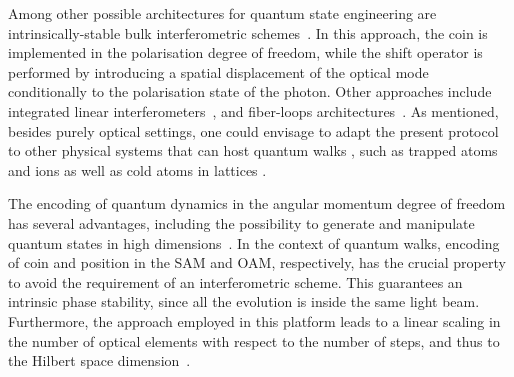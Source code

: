 Among other possible architectures for quantum state engineering are intrinsically-stable bulk interferometric schemes~\cite{broome2010discrete,kitagawa2012observation,vitelli2013joining}.
In this approach, the coin is implemented in the polarisation degree of freedom,
while the shift operator is performed by introducing a spatial displacement of the optical mode conditionally to the polarisation state of the photon.
Other approaches include integrated linear interferometers~\cite{sansoni2012twoparticle, crespi2013anderson, harris2015bosonic, pitsios2016photonic}, and fiber-loops architectures~\cite{schreiber2010photons, schreiber2012a, boutari2016large}. As mentioned, besides purely optical settings, one could envisage to adapt the present protocol to other physical systems that can host quantum walks \cite{manouchehri2014physical}, such as trapped atoms \cite{karski2009quantum} and ions \cite{schmitz2009quantum, zhringer2010realization} as well as cold atoms in lattices \cite{weitenberg2011singlespin, fukuhara2013microscopic, preiss2015strongly}.

The encoding of quantum dynamics in the angular momentum degree of freedom has several advantages, including the possibility to generate and manipulate quantum states in high dimensions~\cite{fickler2012quantum,dambrosio2013photonic}. In the context of quantum walks, encoding of coin and position in the \ac{SAM} and \ac{OAM}, respectively, has the crucial property to avoid the requirement of an interferometric scheme. This guarantees an intrinsic phase stability, since all the evolution is inside the same light beam. Furthermore, the approach employed in this platform leads to a linear scaling in the number of optical elements with respect to the number of steps, and thus to the Hilbert space dimension~\cite{cardano2015quantum}.

